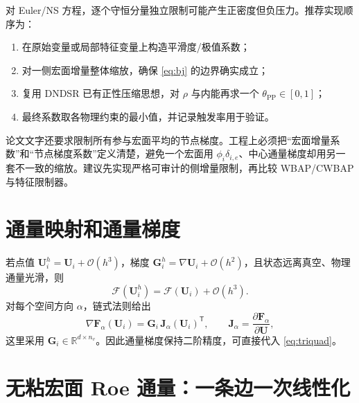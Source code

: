 \documentclass[UTF8,a4paper,11pt,openany]{ctexrep}
\numberwithin{equation}{chapter}
\newcommand{\Order}{\mathcal O}
\newcommand{\Flux}{\bm{\mathcal F}}
\newcommand{\grad}{\nabla}
\newcommand{\transpose}{\mathsf T}
\begin{document}
对 Euler/NS 方程，逐个守恒分量独立限制可能产生正密度但负压力。推荐实现顺序为：

\begin{enumerate}
  \item 在原始变量或局部特征变量上构造平滑度/极值系数；
  \item 对一侧宏面增量整体缩放，确保 \cref{eq:bj} 的边界确实成立；
  \item 复用 DNDSR 已有正性压缩思想，对 $\rho$ 与内能再求一个 $\theta_{\mathrm{PP}}\in[0,1]$；
  \item 最终系数取各物理约束的最小值，并记录触发率用于验证。
\end{enumerate}

论文文字还要求限制所有参与宏面平均的节点梯度。工程上必须把“宏面增量系数”和“节点梯度系数”定义清楚，避免一个宏面用 $\phi_i\delta_{i,e}$、中心通量梯度却用另一套不一致的缩放。建议先实现严格可审计的侧增量限制，再比较 WBAP/CWBAP 与特征限制器。

\section{通量映射和通量梯度}

若点值 $\bm U_i^h=\bm U_i+\Order(h^3)$，梯度 $\bm G_i^h=\grad\bm U_i+\Order(h^2)$，且状态远离真空、物理通量光滑，则
\begin{equation}
  \Flux(\bm U_i^h)=\Flux(\bm U_i)+\Order(h^3).
\end{equation}
对每个空间方向 $\alpha$，链式法则给出
\begin{equation}
  \grad \bm F_{\alpha}(\bm U_i)
  =\bm G_i\,\bm J_{\alpha}(\bm U_i)^{\transpose},
  \qquad
  \bm J_{\alpha}=\frac{\partial\bm F_{\alpha}}{\partial\bm U},
  \label{eq:fluxgrad}
\end{equation}
这里采用 $\bm G_i\in\mathbb R^{d\times n_v}$。因此通量梯度保持二阶精度，可直接代入 \cref{eq:triquad}。

\section{无粘宏面 Roe 通量：一条边一次线性化}
\end{document}
